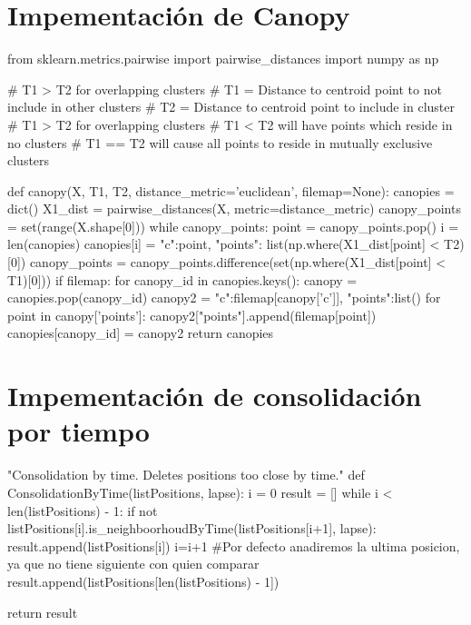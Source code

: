\documentclass[a4paper, 12pt]{article}
\begin{document}
\newpage
\section{Impementaci\'on de Canopy} \label{App:AppendixD}

\begin{python}
from sklearn.metrics.pairwise import pairwise_distances
import numpy as np

# T1 > T2 for overlapping clusters
# T1 = Distance to centroid point to not include in other clusters
# T2 = Distance to centroid point to include in cluster
# T1 > T2 for overlapping clusters
# T1 < T2 will have points which reside in no clusters
# T1 == T2 will cause all points to reside in mutually exclusive clusters

def canopy(X, T1, T2, distance_metric='euclidean', filemap=None):
    canopies = dict()
    X1_dist = pairwise_distances(X, metric=distance_metric)
    canopy_points = set(range(X.shape[0]))
    while canopy_points:
        point = canopy_points.pop()
        i = len(canopies)
        canopies[i] = {"c":point, "points": list(np.where(X1_dist[point] < T2)[0])}
        canopy_points = canopy_points.difference(set(np.where(X1_dist[point] < T1)[0]))
    if filemap:
        for canopy_id in canopies.keys():
            canopy = canopies.pop(canopy_id)
            canopy2 = {"c":filemap[canopy['c']], "points":list()}
            for point in canopy['points']:
                canopy2["points"].append(filemap[point])
            canopies[canopy_id] = canopy2
    return canopies

\end{python}

\newpage
\section{Impementaci\'on de consolidaci\'on por tiempo} \label{App:AppendixF}

\begin{python}
"Consolidation by time. Deletes positions too close by time."
def ConsolidationByTime(listPositions, lapse):
	i = 0
	result = []
	while i < len(listPositions) - 1:
		if not listPositions[i].is_neighboorhoudByTime(listPositions[i+1], lapse):
			result.append(listPositions[i])
		i=i+1
	#Por defecto anadiremos la ultima posicion, ya que no tiene siguiente con quien comparar
	result.append(listPositions[len(listPositions) - 1])

	return result
\end{python}
\end{document}
